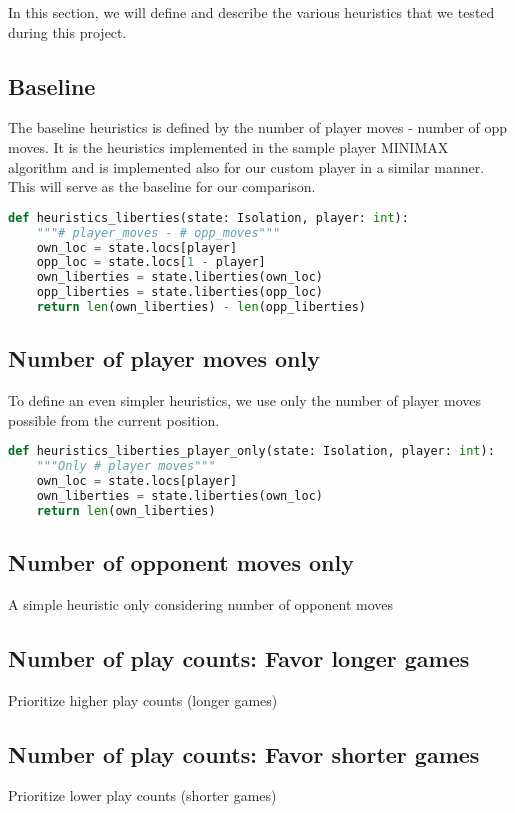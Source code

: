 \documentclass[aps,prd,notitlepage,floatfix,superscriptaddress,groupedaddress,nofootinbib]{revtex4-1}
\begin{document}
In this section, we will define and describe the various heuristics that we tested during this project.

\subsection{Baseline}
The baseline heuristics is defined by the number of player moves - number of opp moves. It is the heuristics implemented in the sample player MINIMAX algorithm and is implemented also for our custom player in a similar manner. This will serve as the baseline for our comparison.

\begin{lstlisting}[language=python]
def heuristics_liberties(state: Isolation, player: int):
    """# player_moves - # opp_moves"""
    own_loc = state.locs[player]
    opp_loc = state.locs[1 - player]
    own_liberties = state.liberties(own_loc)
    opp_liberties = state.liberties(opp_loc)
    return len(own_liberties) - len(opp_liberties)
\end{lstlisting}

\subsection*{Number of player moves only}
To define an even simpler heuristics, we use only the number of player moves possible from the current position.

\begin{lstlisting}[language=python]
def heuristics_liberties_player_only(state: Isolation, player: int):
    """Only # player moves"""
    own_loc = state.locs[player]
    own_liberties = state.liberties(own_loc)
    return len(own_liberties)
\end{lstlisting}

\subsection*{Number of opponent moves only}
A simple heuristic only considering number of opponent moves

\subsection*{Number of play counts: Favor longer games}
Prioritize higher play counts (longer games)

\subsection*{Number of play counts: Favor shorter games}
Prioritize lower play counts (shorter games)
\end{document}
